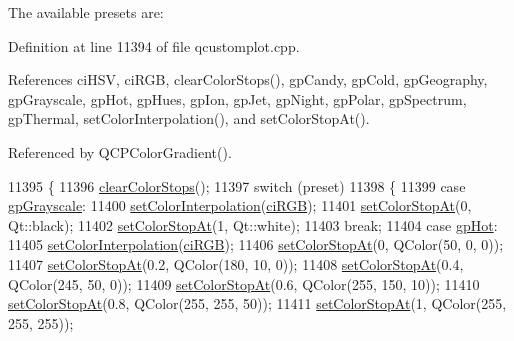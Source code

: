 The available presets are\+:  

Definition at line 11394 of file qcustomplot.\+cpp.



References ci\+H\+S\+V, ci\+R\+G\+B, clear\+Color\+Stops(), gp\+Candy, gp\+Cold, gp\+Geography, gp\+Grayscale, gp\+Hot, gp\+Hues, gp\+Ion, gp\+Jet, gp\+Night, gp\+Polar, gp\+Spectrum, gp\+Thermal, set\+Color\+Interpolation(), and set\+Color\+Stop\+At().



Referenced by Q\+C\+P\+Color\+Gradient().


\begin{DoxyCode}
11395 \{
11396   \hyperlink{class_q_c_p_color_gradient_a939213e85f0d1279519d555c5fcfb6ad}{clearColorStops}();
11397   \textcolor{keywordflow}{switch} (preset)
11398   \{
11399     \textcolor{keywordflow}{case} \hyperlink{class_q_c_p_color_gradient_aed6569828fee337023670272910c9072add11ae369a86f3b1b6205ec72e5021fb}{gpGrayscale}:
11400       \hyperlink{class_q_c_p_color_gradient_aa13fda86406e1d896a465a409ae63b38}{setColorInterpolation}(\hyperlink{class_q_c_p_color_gradient_ac5dca17cc24336e6ca176610e7f77fc1a5e30f725c9cfe93999e268a9f92afbe7}{ciRGB});
11401       \hyperlink{class_q_c_p_color_gradient_a3b48be5e78079db1bb2a1188a4c3390e}{setColorStopAt}(0, Qt::black);
11402       \hyperlink{class_q_c_p_color_gradient_a3b48be5e78079db1bb2a1188a4c3390e}{setColorStopAt}(1, Qt::white);
11403       \textcolor{keywordflow}{break};
11404     \textcolor{keywordflow}{case} \hyperlink{class_q_c_p_color_gradient_aed6569828fee337023670272910c9072a4f42e534cf6cff5a29a5388094d099b5}{gpHot}:
11405       \hyperlink{class_q_c_p_color_gradient_aa13fda86406e1d896a465a409ae63b38}{setColorInterpolation}(\hyperlink{class_q_c_p_color_gradient_ac5dca17cc24336e6ca176610e7f77fc1a5e30f725c9cfe93999e268a9f92afbe7}{ciRGB});
11406       \hyperlink{class_q_c_p_color_gradient_a3b48be5e78079db1bb2a1188a4c3390e}{setColorStopAt}(0, QColor(50, 0, 0));
11407       \hyperlink{class_q_c_p_color_gradient_a3b48be5e78079db1bb2a1188a4c3390e}{setColorStopAt}(0.2, QColor(180, 10, 0));
11408       \hyperlink{class_q_c_p_color_gradient_a3b48be5e78079db1bb2a1188a4c3390e}{setColorStopAt}(0.4, QColor(245, 50, 0));
11409       \hyperlink{class_q_c_p_color_gradient_a3b48be5e78079db1bb2a1188a4c3390e}{setColorStopAt}(0.6, QColor(255, 150, 10));
11410       \hyperlink{class_q_c_p_color_gradient_a3b48be5e78079db1bb2a1188a4c3390e}{setColorStopAt}(0.8, QColor(255, 255, 50));
11411       \hyperlink{class_q_c_p_color_gradient_a3b48be5e78079db1bb2a1188a4c3390e}{setColorStopAt}(1, QColor(255, 255, 255));

\end{DoxyCode}
